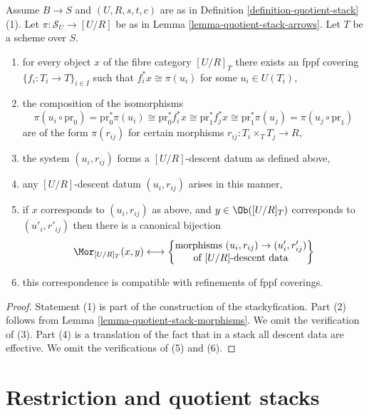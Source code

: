 \begin{lemma}
\label{lemma-quotient-stack-objects}
Assume $B \to S$ and $(U, R, s, t, c)$ are as in
Definition \ref{definition-quotient-stack} (1).
Let $\pi : \mathcal{S}_U \to [U/R]$ be as in
Lemma \ref{lemma-quotient-stack-arrows}.
Let $T$ be a scheme over $S$.
\begin{enumerate}
\item for every object $x$ of the fibre category $[U/R]_T$
there exists an fppf covering $\{f_i : T_i \to T\}_{i \in I}$ such that
$f_i^*x \cong \pi(u_i)$ for some $u_i \in U(T_i)$,
\item the composition of the isomorphisms
$$
\pi(u_i \circ \text{pr}_0)
=
\text{pr}_0^*\pi(u_i)
\cong
\text{pr}_0^*f_i^*x
\cong
\text{pr}_1^*f_j^*x
\cong
\text{pr}_1^*\pi(u_j)
=
\pi(u_j \circ \text{pr}_1)
$$
are of the form $\pi(r_{ij})$ for certain morphisms
$r_{ij} : T_i \times_T T_j \to R$,
\item the system $(u_i, r_{ij})$ forms
a $[U/R]$-descent datum as defined above,
\item any $[U/R]$-descent datum $(u_i, r_{ij})$ arises in this manner,
\item if $x$ corresponds to $(u_i, r_{ij})$ as above, and
$y \in \Ob([U/R]_T)$ corresponds to $(u'_i, r'_{ij})$
then there is a canonical bijection
$$
\Mor_{[U/R]_T}(x, y)
\longleftrightarrow
\left\{
\begin{matrix}
\text{morphisms }(u_i, r_{ij}) \to (u'_i, r'_{ij})\\
\text{of }[U/R]\text{-descent data}
\end{matrix}
\right\}
$$
\item this correspondence is compatible with refinements of fppf coverings.
\end{enumerate}
\end{lemma}

\begin{proof}
Statement (1) is part of the construction of the stackyfication.
Part (2) follows from
Lemma \ref{lemma-quotient-stack-morphisms}.
We omit the verification of (3).
Part (4) is a translation of the fact that in a stack all descent data
are effective.
We omit the verifications of (5) and (6).
\end{proof}








\section{Restriction and quotient stacks}
\label{section-quotient-stack-restrict}

